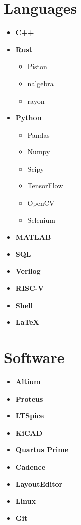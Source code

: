 \documentclass[]{chandan-cv}
\begin{document}
\begin{minipage}[t]{0.23\textwidth}


\section{Languages}
	\begin{itemize}
		\setlength\itemsep{-0.2em}
		\item \textbf{C++}
		\item \textbf{Rust}
				\begin{itemize}
						\setlength\itemsep{-0.17em}
						\item Piston
						\item nalgebra
						\item rayon
				\end{itemize}
		\item \textbf{Python}
			\begin{itemize}
				\setlength\itemsep{-0.17em}
				\item Pandas
				\item Numpy
				\item Scipy
				\item TensorFlow
				\item OpenCV
				\item Selenium
			\end{itemize}
		\item \textbf{MATLAB}
		\item \textbf{SQL}
		\item \textbf{Verilog}
		\item \textbf{RISC-V}
		\item \textbf{Shell}
		\item \textbf{LaTeX}
	\end{itemize}


\section{Software}
	\begin{itemize}
		\setlength\itemsep{-0.17em}
		\item \textbf{Altium}
		\item \textbf{Proteus}
		\item \textbf{LTSpice}
		\item \textbf{KiCAD}
		\item \textbf{Quartus Prime}
		\item \textbf{Cadence}
		\item \textbf{LayoutEditor}
		\item \textbf{Linux}
		\item \textbf{Git}
	\end{itemize}


\end{minipage}
\end{document}
